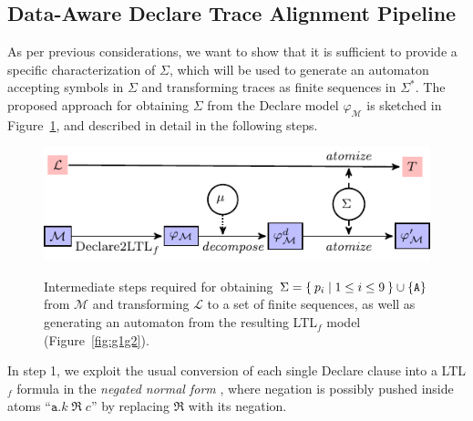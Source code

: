 

\subsection{Data-Aware Declare Trace Alignment Pipeline}\label{sec:dadtap}
As per previous considerations, we want to show that it is sufficient to provide a specific characterization of $\Sigma$, which will be used to generate an automaton accepting symbols in $\Sigma$ and transforming traces as finite sequences in $\Sigma^*$. The proposed approach for obtaining $\Sigma$ from the Declare model $\varphi_{\mathcal{M}}$ is sketched in Figure~\ref{fig:twoexamples}, and described in detail in the following steps.

\begin{figure}[!t]
	{\hspace{-1.3cm}\includegraphics[width=1.3\textwidth]{images/example_3}}
	\caption{Intermediate steps required for obtaining $\Sigma=\Set{p_i|1\leq i\leq 9}\cup\{\texttt{A}\}$ from $\mathcal{M}$ and transforming $\mathcal{L}$ to a set of finite sequences, as well as generating an automaton from the resulting LTL$_f$ model (Figure~\ref{fig:g1g2}).}\label{fig:twoexamples}
\end{figure}
In step 1, we exploit the usual conversion of each single Declare clause into a LTL$_f$ formula in the \textit{negated normal form} \cite{LiPZVR20}, where negation is possibly pushed inside atoms ``$\texttt{a}.k\;\Re\; c$'' by replacing $\Re$ with its negation. 

